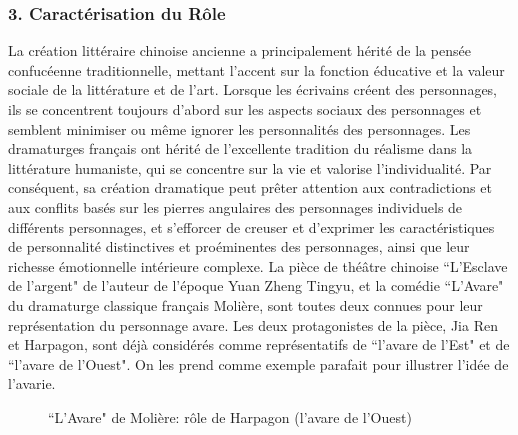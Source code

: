 \documentclass[UTF8,a4paper,12pt]{ctexart}
\numberwithin{equation}{section}
\newcommand{\mycite}[1]{\cite{#1}}
\begin{document}
\subsubsection*{3. Caractérisation du Rôle}
La création littéraire chinoise ancienne a principalement hérité de la pensée confucéenne traditionnelle, mettant l'accent sur la fonction éducative et la valeur sociale de la littérature et de l'art. Lorsque les écrivains créent des personnages, ils se concentrent toujours d'abord sur les aspects sociaux des personnages et semblent minimiser ou même ignorer les personnalités des personnages. Les dramaturges français ont hérité de l'excellente tradition du réalisme dans la littérature humaniste, qui se concentre sur la vie et valorise l'individualité. Par conséquent, sa création dramatique peut prêter attention aux contradictions et aux conflits basés sur les pierres angulaires des personnages individuels de différents personnages, et s'efforcer de creuser et d'exprimer les caractéristiques de personnalité distinctives et proéminentes des personnages, ainsi que leur richesse émotionnelle intérieure complexe. 
La pièce de théâtre chinoise ``L'Esclave de l'argent"\mycite{78} de l'auteur de l'époque Yuan Zheng Tingyu, et la comédie ``L'Avare"\mycite{bernard1906avare} du dramaturge classique français Molière, sont toutes deux connues pour leur représentation du personnage avare. Les deux protagonistes de la pièce, Jia Ren et Harpagon, sont déjà considérés comme représentatifs de ``l'avare de l'Est" et de ``l'avare de l'Ouest". On les prend comme exemple parafait pour illustrer l'idée de l'avarie. 

\begin{figure}[H] 
\captionsetup{justification=centering, singlelinecheck=false}
\caption{ ``L'Avare" de Molière: rôle de Harpagon (l'avare de l'Ouest)}
\end{figure}
\end{document}

